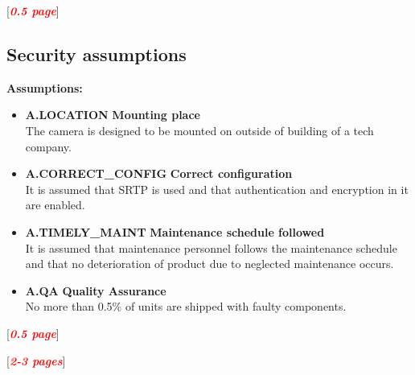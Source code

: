 \documentclass[10pt]{article}
\newcommand{\comm}[1]{{\leavevmode\color{gray}#1}}
\newcommand{\todo}[1]{
  \begin{center}
    [\textcolor{red}{\textbf{\textit{#1}}}]
  \end{center}
}
\newcommand{\objective}[3]{\item{\textbf{O.#1} \hfill \textbf{#2} \\ #3}}
\newcommand{\assumption}[3]{\item{\textbf{A.#1} \hfill \textbf{#2} \\ #3}} %
\newcommand{\escape}[1]{\PVerb{#1}}
\newenvironment{checklist}{%
  \begin{list}{}{}%
  \let\olditem\item
  \renewcommand\item{\olditem -- \marginpar{$\Box$} }
  \newcommand\checkeditem{\olditem -- \marginpar{$\CheckedBox$} }
}{%
  \end{list}
}
\begin{document}
    \todo{0.5 page}

    \subsection{Security assumptions}

	\textbf{Assumptions:}
     \begin{itemize}
       \assumption{LOCATION}{Mounting place}{The camera is designed to be mounted on outside of building of a tech company.}
       \assumption{CORRECT\_CONFIG}{Correct configuration}{It is assumed that SRTP is used and that authentication and encryption in it are enabled.}
       \assumption{TIMELY\_MAINT}{Maintenance schedule followed}{It is assumed that maintenance personnel follows the maintenance schedule
       and that no deterioration of product due to neglected maintenance occurs.}
       \assumption{QA}{Quality Assurance}{No more than 0.5\% of units are shipped with faulty components.}
     \end{itemize}

      \todo{0.5 page}


    \todo{2-3 pages}

%
\end{document}
